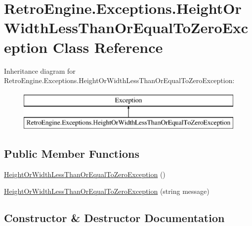 \hypertarget{class_retro_engine_1_1_exceptions_1_1_height_or_width_less_than_or_equal_to_zero_exception}{}\section{Retro\+Engine.\+Exceptions.\+Height\+Or\+Width\+Less\+Than\+Or\+Equal\+To\+Zero\+Exception Class Reference}
\label{class_retro_engine_1_1_exceptions_1_1_height_or_width_less_than_or_equal_to_zero_exception}
Inheritance diagram for Retro\+Engine.\+Exceptions.\+Height\+Or\+Width\+Less\+Than\+Or\+Equal\+To\+Zero\+Exception\+:\begin{figure}[H]
\begin{center}
\leavevmode
\includegraphics[height=2.000000cm]{class_retro_engine_1_1_exceptions_1_1_height_or_width_less_than_or_equal_to_zero_exception}
\end{center}
\end{figure}
\subsection*{Public Member Functions}
\begin{DoxyCompactItemize}
\item 
\mbox{\hyperlink{class_retro_engine_1_1_exceptions_1_1_height_or_width_less_than_or_equal_to_zero_exception_a2a9391f5cbfaf6815cb1d27eb60a423e}{Height\+Or\+Width\+Less\+Than\+Or\+Equal\+To\+Zero\+Exception}} ()
\item 
\mbox{\hyperlink{class_retro_engine_1_1_exceptions_1_1_height_or_width_less_than_or_equal_to_zero_exception_a0dd328d283661af035a883be73fe78bc}{Height\+Or\+Width\+Less\+Than\+Or\+Equal\+To\+Zero\+Exception}} (string message)
\end{DoxyCompactItemize}


\subsection{Constructor \& Destructor Documentation}
\mbox{\label{class_retro_engine_1_1_exceptions_1_1_height_or_width_less_than_or_equal_to_zero_exception_a2a9391f5cbfaf6815cb1d27eb60a423e}} 

